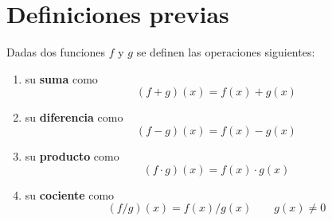 \chapter*{Definiciones previas}

\begin{definition*}
Dadas dos funciones \(f\) y \(g\) se definen las operaciones siguientes:

\begin{enumerate}
\item su \textbf{suma} como 
	\[
		(f+g)(x)=f(x)+g(x)
	\]
	
\item su \textbf{diferencia} como
	\[
		(f-g)(x)=f(x)-g(x)
	\]

\item su \textbf{producto} como
	\[
		(f\cdot g)(x)=f(x)\cdot g(x)
	\]

\item su \textbf{cociente} como
	\[
	(f/ g)(x)=f(x)/g(x)\qquad g(x)\neq 0
	\]
\end{enumerate}

\end{definition*}

